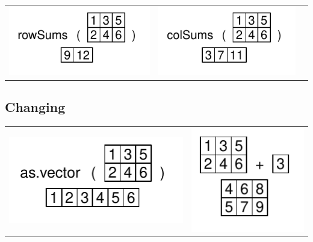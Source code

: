 \documentclass[pdflatex]{article}
\begin{document}
\begin{tabular}{ccc}
\includegraphics{rowSums} & \includegraphics{colSums}
\end{tabular}

\subsection{Changing}

\begin{tabular}{cc}
\includegraphics{as_vector} & \includegraphics{matrix_operator}\\
\end{tabular}
\end{document}
